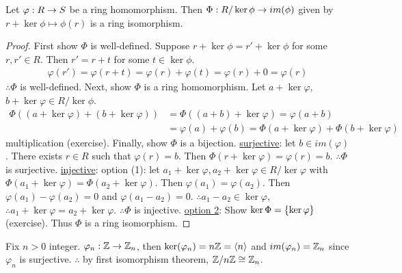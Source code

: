 \documentclass[]{article}
\begin{document}
\begin{theorem}
	Let $\varphi:R\rightarrow S$ be a ring homomorphism.
	Then $\Phi:R/\ker\phi\rightarrow im(\phi)$ given by $r+\ker\phi\mapsto\phi(r)$ is a ring isomorphism.
\end{theorem}
\begin{proof}
	First show $\Phi$ is well-defined. Suppose $r+\ker\phi=r'+\ker\phi$ for some $r,r'\in R$.
	Then $r'=r+t$ for some $t\in\ker\phi$.
	\begin{align*}
		\varphi(r') = \varphi(r+t) = \varphi(r)+\varphi(t) = \varphi(r)+0 = \varphi(r)
	\end{align*}
	$\therefore\Phi$ is well-defined. Next, show $\Phi$ is a ring homomorphism.
	Let $a+\ker\varphi$, $b+\ker\varphi\in R/\ker\phi$.
	\begin{align*}
		\Phi((a+\ker\varphi)+(b+\ker\varphi)) &= \Phi((a+b)+\ker\varphi) = \varphi(a+b) \\
		&= \varphi(a)+\varphi(b) = \Phi(a+\ker\varphi) + \Phi(b+\ker\varphi)
	\end{align*}
	multiplication (exercise). Finally, show $\Phi$ is a bijection.
	\ul{surjective}: let $b\in im(\varphi)$. There exists $r\in R$ such that $\varphi(r)=b$.
	Then $\Phi(r+\ker\varphi)=\varphi(r)=b$. $\therefore\Phi$ is surjective.
	\ul{injective}: option (1): let $a_1+\ker\varphi,a_2+\ker\varphi\in R/\ker\varphi$ with $\Phi(a_1+\ker\varphi)=\Phi(a_2+\ker\varphi)$.
	Then $\varphi(a_1)=\varphi(a_2)$. Then $\varphi(a_1)-\varphi(a_2)=0$ and $\varphi(a_1-a_2)=0$. $\therefore a_1-a_2\in\ker\varphi$, $\therefore a_1+\ker\varphi=a_2+\ker\varphi$. $\therefore \Phi$ is injective.
	\ul{option 2}: Show $\ker\Phi=\left\{ \ker\varphi \right\}$ (exercise).
	Thus $\Phi$ is a ring isomorphism.
\end{proof}
\begin{example}
	Fix $n>0$ integer. $\varphi_n:\mathbb{Z}\rightarrow\mathbb{Z}_n$, then $\ker(\varphi_n)=n\mathbb{Z}=\left\langle n \right\rangle$ and $im(\varphi_n)=\mathbb{Z}_n$ since $\varphi_n$ is surjective.
	$\therefore$ by first isomorphism theorem, $\mathbb{Z}/n\mathbb{Z}\cong\mathbb{Z}_n$.
\end{example}
\end{document}
